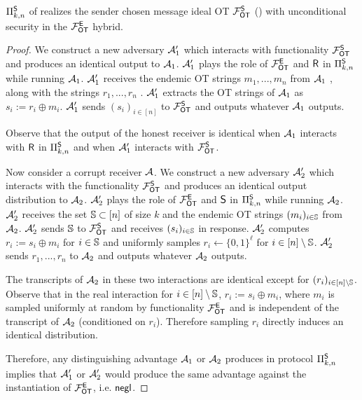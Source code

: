 \begin{lemma}\label{lem:EtoS}
	$\Pi^{\mathsf{S}}_{k,n}$ of  realizes the sender chosen message ideal OT $\mathcal{F}_{\mathsf{OT}}^{\mathsf{S}}$ () with unconditional security in the $\mathcal{F}_{\mathsf{OT}}^\mathsf{E}$ hybrid.
\end{lemma}

\iffullversion
\begin{proof}
 We construct a new adversary $\mathcal{A}_1'$ which interacts with functionality $\mathcal{F}_{\mathsf{OT}}^\mathsf{S}$ and produces an identical output  to $\mathcal{A}_1$.  $\mathcal{A}_1'$ plays the role of $\mathcal{F}_{\mathsf{OT}}^\mathsf{E}$ and $\mathsf{R}$ in $\Pi^{\mathsf{S}}_{k,n}$ while running $\mathcal{A}_1$. $\mathcal{A}_1'$ receives the endemic OT strings $m_1,...,m_n$ from $\mathcal{A}_1$%
, along with the strings $r_1,...,r_n$%
.  $\mathcal{A}_1'$ extracts the OT strings of $\mathcal{A}_1$ as $s_i:=r_i\oplus m_i$. $\mathcal{A}_1'$ sends $(s_i)_{i\in [n]}$ to $\mathcal{F}_{\mathsf{OT}}^\mathsf{S}$ and outputs whatever $\mathcal{A}_1$ outputs.
	
	Observe that the output of the honest receiver is identical when $\mathcal{A}_1$ interacts with $\mathsf{R}$ in $\Pi^{\mathsf{S}}_{k,n}$ and when $\mathcal{A}_1'$ interacts with $\mathcal{F}_{\mathsf{OT}}^\mathsf{S}$.
	
	
	
	Now consider a corrupt receiver $\mathcal{A}$. We construct a new adversary $\mathcal{A}_2'$ which interacts with the functionality $\mathcal{F}_{\mathsf{OT}}^\mathsf{S}$ and produces an identical output distribution to $\mathcal{A}_2$. $\mathcal{A}_2'$ plays the role of $\mathcal{F}_{\mathsf{OT}}^\mathsf{E}$ and $\mathsf{S}$ in $\Pi^{\mathsf{S}}_{k,n}$ while running $\mathcal{A}_2$. $\mathcal{A}_2'$ receives the set $\mathsf{\mathbb S}\subset[n]$ of size $k$ and the endemic OT strings $(m_i)_{i\in \mathsf{\mathbb S}}$ from $\mathcal{A}_2$. $\mathcal{A}_2'$ sends $\mathsf{\mathbb S}$ to  $\mathcal{F}_{\mathsf{OT}}^\mathsf{S}$ and receives $(s_i)_{i\in \mathsf{\mathbb S}}$ in response. $\mathcal{A}_2'$ computes $r_i:=s_i\oplus m_i$ for $i\in \mathsf{\mathbb S}$ and uniformly samples $r_i\gets \{0,1\}^\ell$ for $i\in [n]\setminus \mathsf{\mathbb S}$. $\mathcal{A}_2'$ sends $r_1,...,r_n$ to $\mathcal{A}_2$ and outputs whatever $\mathcal{A}_2$ outputs.

	The transcripts of $\mathcal{A}_2$ in these two interactions are identical except for $(r_i)_{i\in [n]\setminus \mathsf{\mathbb S}}$. Observe that in the real interaction for $i\in [n]\setminus\mathsf{\mathbb S}$, $r_i:=s_i\oplus m_i$, where $m_i$ is sampled uniformly at random  by functionality $\mathcal{F}_{\mathsf{OT}}^\mathsf{E}$ and is independent of the transcript of $\mathcal{A}_2$ (conditioned on $r_i$). Therefore sampling $r_i$ directly induces an identical distribution. 
	
	Therefore, any distinguishing advantage $\mathcal{A}_1$ or $\mathcal{A}_2$ produces in protocol $\Pi^{\mathsf{S}}_{k,n}$ implies that $\mathcal{A}_1'$ or $\mathcal{A}_2'$ would produce the same advantage against the instantiation of $\mathcal{F}_{\mathsf{OT}}^\mathsf{E}$, i.e. $\mathsf{negl}$.
\end{proof}

